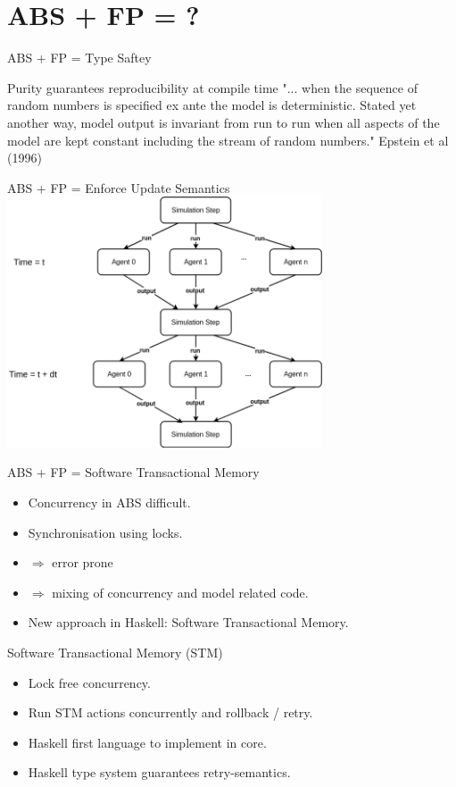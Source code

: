 \documentclass{beamer} %
\begin{document}
\section{ABS + FP = ?}
\begin{frame}{ABS + FP = Type Saftey}
	\begin{block}{Purity guarantees reproducibility at compile time}
    "... when the sequence of random numbers is specified ex ante the model is deterministic. Stated yet another way, model output is invariant from run to run when all aspects of the model are kept constant including the stream of random numbers." Epstein et al (1996)
    \end{block}
\end{frame}

\begin{frame}{ABS + FP = Enforce Update Semantics}
  \includegraphics[width=0.7\textwidth]{./fig/parallel_strategy.png}
\end{frame}

\begin{frame}{ABS + FP = Software Transactional Memory}
  \begin{itemize}
  	\item Concurrency in ABS difficult.
	\item Synchronisation using locks.
  	\item $\Rightarrow$ error prone 
  	\item $\Rightarrow$ mixing of concurrency and model related code.
  	\item New approach in Haskell: Software Transactional Memory.
  \end{itemize}
\end{frame}

\begin{frame}{Software Transactional Memory (STM)}
  \begin{itemize}   	
  	\item Lock free concurrency.
  	\item Run STM actions concurrently and rollback / retry.
  	\item Haskell first language to implement in core.    
    \item Haskell type system guarantees retry-semantics.
  \end{itemize}
\end{frame}
\end{document}
